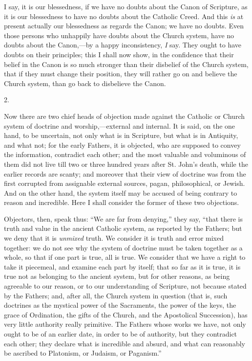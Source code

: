 I say, it is our blessedness, if we have no doubts about the Canon
of Scripture, as it is our blessedness to have no doubts about the
Catholic Creed. And this \emph{is} at present actually our blessedness
as regards the Canon; we have no doubts. Even those persons who
unhappily have doubts about the Church system, have no doubts about
the Canon,—by a happy inconsistency, \emph{I} say. They ought to
have doubts on their principles; this I shall now show, in the
confidence that their belief in the Canon is so much stronger
than their disbelief of the Church system, that if they must change
their position, they will rather go on and believe the Church system,
than go back to disbelieve the Canon.

2.

Now there are two chief heads of objection made against the
Catholic or Church system of doctrine and worship,—external and
internal. It is said, on the one hand, to be uncertain, not only what
is in Scripture, but what is in Antiquity, and what not; for the early
Fathers, it is objected, who are supposed to convey the information,
contradict each other; and the most valuable and voluminous of them
did not live till two or three hundred years after St. John's death,
while the earlier records are scanty; and moreover that their view of
doctrine was from the first corrupted from assignable external
sources, pagan, philosophical, or Jewish. And on the other hand, the
system itself may be accused of being contrary to reason and
incredible. Here I shall consider the former of these two objections.

Objectors, then, speak thus: ``We are far from denying,''
they say, ``that there is truth and value in the ancient Catholic
system, as reported by the Fathers; but we deny that it is \emph{unmixed}
truth. We consider it is truth and error mixed together: we do not see
why the system of doctrine must be taken together as a whole, so that
if one part is true, all is true. We consider that we have a right to
take it piecemeal, and examine each part by itself; that so far as it
is true, it is true not as belonging to the ancient system, but for
other reasons, as being agreeable to our reason, or to our
understanding of Scripture, not because stated by the Fathers; and,
after all, the Church system in question (that is, such
doctrines as the mystical power of the Sacraments, the power of the
keys, the grace of Ordination, the gifts of the Church, and the
Apostolical Succession), has very little authority really primitive.
The Fathers whose works we have, not only ought to be of an earlier
date, in order to be of authority, but they contradict each other;
they declare what is incredible and absurd, and what can reasonably be
ascribed to Platonism, or Judaism, or Paganism.''

